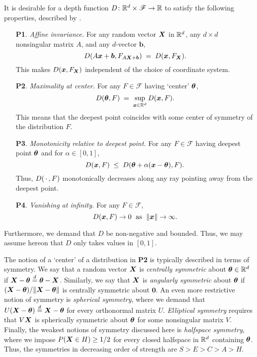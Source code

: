 
It is desirable for a depth function $D\colon \mathbb{R}^d \times \mathscr{F} \to \mathbb{R}$
to satisfy the following properties, described by
\textcite{zuo-serfling-2000}.

\begin{enumerate}
    \item[\textbf{P1}.] \emph{Affine invariance.}
        For any random vector $\bm{X}$ in $\mathbb{R}^d$, any $d \times d$ nonsingular
        matrix $A$, and any $d$-vector $\bm{b}$,
        \begin{equation}
            D(A\bm{x} + \bm{b}, F_{A\bm{X} + \bm{b}}) \;=\; D(\bm{x}, F_{\bm{X}}).
        \end{equation}
        This makes $D(\bm{x}, F_{\bm{X}})$ independent of the choice of coordinate
        system.

    \item[\textbf{P2}.] \emph{Maximality at center.}
        For any $F \in \mathscr{F}$ having `center' $\bm{\theta}$,
        \begin{equation}
            D(\bm{\theta}, F) \;=\; \sup_{\bm{x} \in \mathbb{R}^d} D(\bm{x}, F).
        \end{equation}
        This means that the deepest point coincides with some center of
        symmetry of the distribution $F$.

    \item[\textbf{P3}.] \emph{Monotonicity relative to deepest point.}
        For any $F \in \mathscr{F}$ having deepest point $\bm{\theta}$ and for
        $\alpha \in [0, 1]$,
        \begin{equation}
            D(\bm{x}, F) \;\leq\; D(\bm{\theta} + \alpha(\bm{x} - \bm{\theta}), F).
        \end{equation}
        Thus, $D(\,\cdot\,, F)$ monotonically decreases along any ray pointing
        away from the deepest point.

    \item[\textbf{P4}.] \emph{Vanishing at infinity.}
        For any $F \in \mathscr{F}$,
        \begin{equation}
            D(\bm{x}, F) \to 0 \;\text{ as }\;\Vert \bm{x} \Vert \to \infty.
        \end{equation}
\end{enumerate}

Furthermore, we demand that $D$ be non-negative and bounded.
Thus, we may assume hereon that $D$ only takes values in $[0, 1]$.

The notion of a `center' of a distribution in \textbf{P2} is typically
described in terms of symmetry.
We say that a random vector $\bm{X}$ is \emph{centrally symmetric} about
$\bm{\theta} \in \mathbb{R}^d$ if $\bm{X} - \bm{\theta} \overset{d}{=} \bm{\theta} - \bm{X}$.
Similarly, we say that $\bm{X}$ is \emph{angularly symmetric} about $\bm{\theta}$ if
$(\bm{X} - \bm{\theta}) / \Vert \bm{X} - \bm{\theta} \Vert$ is centrally symmetric about $\bm0$.
An even more restrictive notion of symmetry is \emph{spherical symmetry},
where we demand that $U(\bm{X} - \bm{\theta}) \overset{d}{=} \bm{X} - \bm{\theta}$ for every orthonormal
matrix $U$.
\emph{Elliptical symmetry} requires that $V\bm{X}$ is spherically symmetric about
$\bm{\theta}$ for some nonsingular matrix $V$.
Finally, the weakest notions of symmetry discussed here is \emph{halfspace
symmetry}, where we impose $P(\bm{X} \in H) \geq 1/2$ for every closed halfspace
in $\mathbb{R}^d$ containing $\bm{\theta}$.
Thus, the symmetries in decreasing order of strength are $S > E > C > A > H$.

